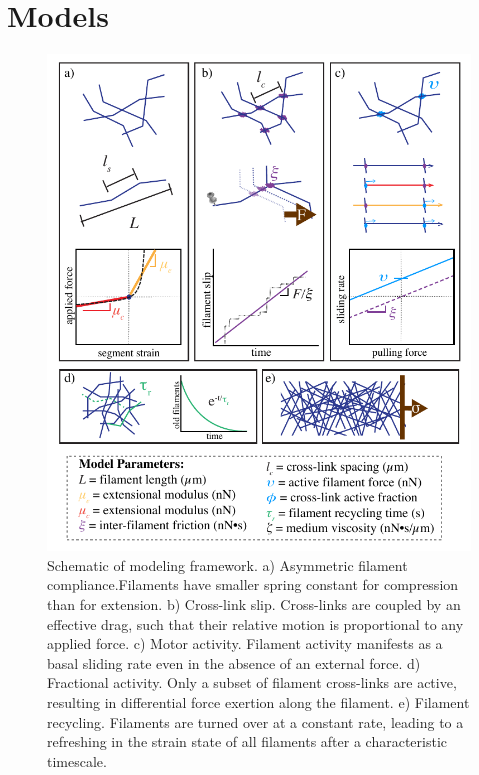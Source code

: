 \documentclass[10pt,letterpaper]{article}
\begin{document}
\section*{Models}

\begin{figure}[h!]
\centering
\includegraphics[width=\hsize]{figures/fig2/fig2}
\caption{\label{fig:sim} Schematic of modeling framework. a) Asymmetric filament compliance.Filaments have smaller spring constant for compression than for extension. b) Cross-link slip. Cross-links are coupled by an effective drag, such that their relative motion is
proportional to any applied force. c) Motor activity. Filament activity manifests as a basal sliding rate even in the absence of an external force. d) Fractional activity. Only a subset of filament cross-links are active, resulting in differential force exertion along the filament. e) Filament recycling. Filaments are turned over at a constant rate, leading to a refreshing in the strain state of all filaments after a characteristic timescale.}
\end{figure}
\end{document}
